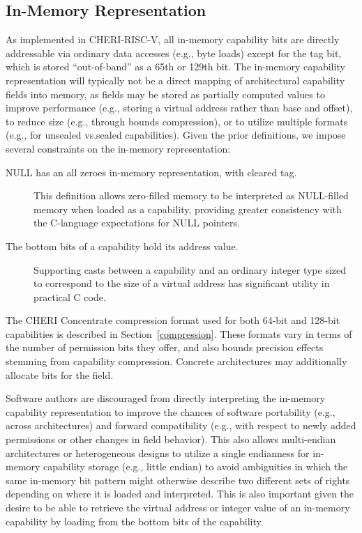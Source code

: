 \subsection{In-Memory Representation}

As implemented in CHERI-RISC-V, all in-memory capability bits
are directly addressable via ordinary data accesses (e.g., byte loads) except
for the tag bit, which is stored ``out-of-band'' as a 65th or 129th bit.
The in-memory capability representation will typically not be a direct mapping
of architectural capability fields into memory, as fields may be stored as
partially computed values to improve performance (e.g., storing a virtual
address rather than base and offset), to reduce size (e.g., through bounds
compression), or to utilize multiple formats (e.g., for unsealed vs.\@ sealed
capabilities).
Given the prior definitions, we impose several constraints on the in-memory
representation:

\begin{description}
\item[NULL has an all zeroes in-memory representation, with cleared tag.]
  This definition allows zero-filled memory to be interpreted as NULL-filled
  memory when loaded as a capability, providing greater consistency with the
  C-language expectations for NULL pointers.

\item[The bottom \xlen{} bits of a capability hold its address value.]
  Supporting casts between a capability and an ordinary integer type sized to
  correspond to the size of a virtual address has significant utility in
  practical C code.
\end{description}

The CHERI Concentrate compression format used for both 64-bit and 128-bit
capabilities is described in Section~\ref{compression}.
These formats vary in terms of the number of permission bits they offer, and
also bounds precision effects stemming from capability compression. Concrete
architectures may additionally allocate bits for the \cflags{} field.

Software authors are discouraged from directly interpreting the in-memory
capability representation to improve the chances of software portability
(e.g., across architectures) and forward compatibility (e.g., with respect to
newly added permissions or other changes in field behavior).
This also allows multi-endian architectures or heterogeneous designs to utilize
a single endianness for in-memory capability storage (e.g., little endian) to
avoid ambiguities in which the same in-memory bit pattern might otherwise
describe two different sets of rights depending on where it is loaded and
interpreted.
This is also important given the desire to be able to retrieve the virtual
address or integer value of an in-memory capability by loading from the bottom
\xlen{} bits of the capability.

